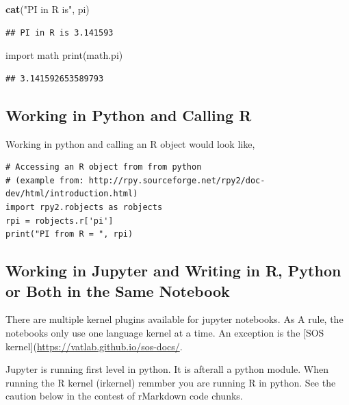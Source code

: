 \documentclass[]{book}
\newenvironment{Shaded}{\begin{snugshade}}{\end{snugshade}}
\newcommand{\KeywordTok}[1]{\textcolor[rgb]{0.13,0.29,0.53}{\textbf{#1}}}
\newcommand{\StringTok}[1]{\textcolor[rgb]{0.31,0.60,0.02}{#1}}
\newcommand{\ImportTok}[1]{#1}
\newcommand{\BuiltInTok}[1]{#1}
\newcommand{\NormalTok}[1]{#1}
\theoremstyle{definition}
\theoremstyle{definition}
\theoremstyle{definition}
\theoremstyle{remark}
\begin{document}
\begin{Shaded}
\begin{Highlighting}[]
\KeywordTok{cat}\NormalTok{(}\StringTok{"PI in R is"}\NormalTok{, pi)}
\end{Highlighting}
\end{Shaded}

\begin{verbatim}
## PI in R is 3.141593
\end{verbatim}

\begin{Shaded}
\begin{Highlighting}[]
\ImportTok{import}\NormalTok{ math}
\BuiltInTok{print}\NormalTok{(math.pi)}
\end{Highlighting}
\end{Shaded}

\begin{verbatim}
## 3.141592653589793
\end{verbatim}

\subsection{Working in Python and Calling
R}\label{working-in-python-and-calling-r}

Working in python and calling an R object would look like,

\begin{verbatim}
# Accessing an R object from from python 
# (example from: http://rpy.sourceforge.net/rpy2/doc-dev/html/introduction.html)
import rpy2.robjects as robjects
rpi = robjects.r['pi']
print("PI from R = ", rpi)
\end{verbatim}

\subsection{Working in Jupyter and Writing in R, Python or Both in the
Same
Notebook}\label{working-in-jupyter-and-writing-in-r-python-or-both-in-the-same-notebook}

There are multiple kernel plugins available for jupyter notebooks. As A
rule, the notebooks only use one language kernel at a time. An exception
is the {[}SOS kernel{]}(\url{https://vatlab.github.io/sos-docs/}.

Jupyter is running first level in python. It is afterall a python
module. When running the R kernel (irkernel) remmber you are running R
in python. See the caution below in the contest of rMarkdown code
chunks.
\end{document}
